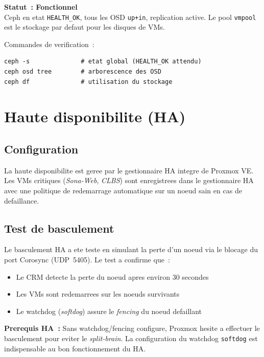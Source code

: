 \documentclass[a4paper,11pt]{article}
\newenvironment{warnbox}{%
  \begin{mdframed}[linecolor=orange,backgroundcolor=orange!8,linewidth=1pt,
    leftmargin=0pt,rightmargin=0pt,innertopmargin=6pt,innerbottommargin=6pt]
}{%
  \end{mdframed}
}
\newenvironment{successbox}{%
  \begin{mdframed}[linecolor=vert,backgroundcolor=vert!7,linewidth=1pt,
    leftmargin=0pt,rightmargin=0pt,innertopmargin=6pt,innerbottommargin=6pt]
}{%
  \end{mdframed}
}
\begin{document}
\begin{successbox}
  \textbf{Statut~: Fonctionnel} \\
  Ceph en etat \texttt{HEALTH\_OK}, tous les OSD \texttt{up+in}, replication active.
  Le pool \texttt{vmpool} est le stockage par defaut pour les disques de VMs.
\end{successbox}

Commandes de verification~:

\begin{lstlisting}[style=shellstyle]
ceph -s              # etat global (HEALTH_OK attendu)
ceph osd tree        # arborescence des OSD
ceph df              # utilisation du stockage
\end{lstlisting}

\section{Haute disponibilite (HA)}

\subsection{Configuration}

La haute disponibilite est geree par le gestionnaire HA integre de Proxmox VE.
Les VMs critiques (\textit{Sona-Web}, \textit{CLBS}) sont enregistrees dans le gestionnaire HA
avec une politique de redemarrage automatique sur un noeud sain en cas de defaillance.

\subsection{Test de basculement}

Le basculement HA a ete teste en simulant la perte d'un noeud via le blocage du
port Corosync (UDP~5405). Le test a confirme que~:

\begin{itemize}[noitemsep]
  \item Le CRM detecte la perte du noeud apres environ 30 secondes
  \item Les VMs sont redemarrees sur les noeuds survivants
  \item Le watchdog (\textit{softdog}) assure le \textit{fencing} du noeud defaillant
\end{itemize}

\begin{warnbox}
  \textbf{Prerequis HA~:} Sans watchdog/fencing configure, Proxmox hesite a effectuer
  le basculement pour eviter le \textit{split-brain}. La configuration du watchdog
  \texttt{softdog} est indispensable au bon fonctionnement du HA.
\end{warnbox}
\end{document}
